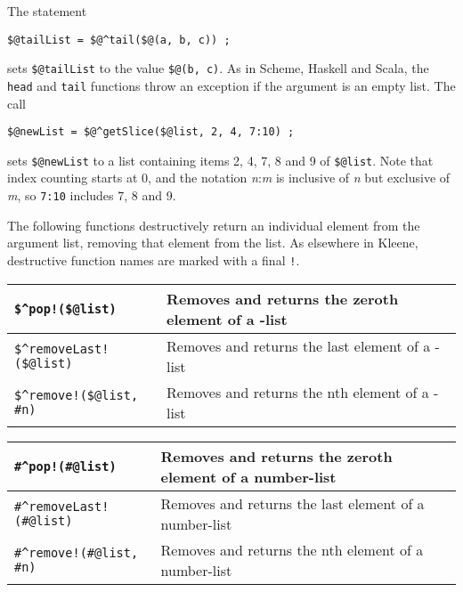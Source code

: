 \vspace{.5cm}

\noindent
The statement

\begin{Verbatim}
$@tailList = $@^tail($@(a, b, c)) ;
\end{Verbatim}

\noindent
sets \verb!$@tailList! to the value \verb!$@(b, c)!.  As in Scheme,
Haskell and Scala, the \texttt{head} and \texttt{tail} functions throw an
exception if the argument is an empty list.  The call

\begin{Verbatim}
$@newList = $@^getSlice($@list, 2, 4, 7:10) ;
\end{Verbatim}

\noindent
sets \verb!$@newList! to a list containing items 2, 4, 7, 8 and 9 of
\verb!$@list!.  Note that index counting starts at 0, and the notation
\emph{n}:\emph{m} is inclusive of \emph{n} but exclusive of \emph{m}, so
\texttt{7:10} includes 7, 8 and 9.

The following functions destructively return an individual element from
the argument list, removing that element from the list.  As elsewhere in
Kleene, destructive function names are marked with a final \verb+!+.

\vspace{.5cm}

\noindent
\begin{tabular}{|l|p{6cm}|}
\hline
\verb+$^pop!($@list)+ & Removes and returns the zeroth element of a
\fsm{}-list\\
\hline
\verb+$^removeLast!($@list)+ & Removes and returns the last element of a
\fsm{}-list\\
\hline
\verb+$^remove!($@list, #n)+ & Removes and returns the nth element of a
\fsm{}-list\\
\hline
\end{tabular}

\vspace{.5cm}

\noindent
\begin{tabular}{|l|p{6cm}|}
\hline
\verb+#^pop!(#@list)+ & Removes and returns the zeroth element of a number-list\\
\hline
\verb+#^removeLast!(#@list)+ & Removes and returns the last element of a number-list\\
\hline
\verb+#^remove!(#@list, #n)+ & Removes and returns the nth element of a number-list\\
\hline
\end{tabular}

